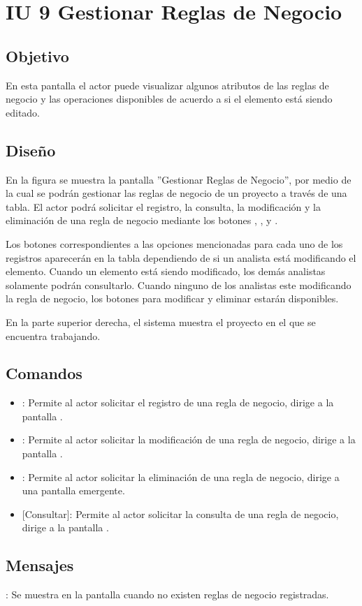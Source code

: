 \section{IU 9 Gestionar Reglas de Negocio}

\subsection{Objetivo}
	En esta pantalla el actor puede visualizar algunos atributos de las reglas de negocio y las operaciones disponibles de acuerdo a si el elemento está siendo editado.
\subsection{Diseño}
	En la figura  se muestra la pantalla ''Gestionar Reglas de Negocio'', por medio de la cual se podrán gestionar las reglas de negocio de un proyecto a través de una tabla. El actor podrá solicitar el registro, la consulta, la modificación y la eliminación de una regla de negocio mediante los botones , , \editar y \eliminar.
	
	Los botones correspondientes a las opciones mencionadas para cada uno de los registros aparecerán en la tabla dependiendo de si un analista está modificando el elemento. Cuando un elemento está siendo modificado, los demás analistas solamente podrán consultarlo. Cuando ninguno de los analistas este modificando la regla de negocio, los botones para modificar y eliminar estarán disponibles.
	
	En la parte superior derecha, el sistema muestra el proyecto en el que se encuentra trabajando.

\subsection{Comandos}
\begin{itemize}
	\item {}: Permite al actor solicitar el registro de una regla de negocio, dirige a la pantalla .
	\item \editar [Modificar]: Permite al actor solicitar la modificación de una regla de negocio, dirige a la pantalla .
	\item \eliminar [Eliminar]: Permite al actor solicitar la eliminación de una regla de negocio, dirige a una pantalla emergente.
	\item {} [Consultar]: Permite al actor solicitar la consulta de una regla de negocio, dirige a la pantalla  .
\end{itemize}
\subsection{Mensajes}

\begin{Citemize}
	\item {}: Se muestra en la pantalla  cuando no existen reglas de negocio registradas.
\end{Citemize}
